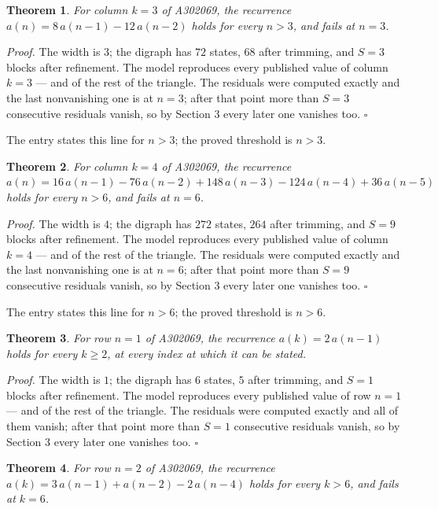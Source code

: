 \documentclass[11pt]{article}
\newtheorem{theorem}{Theorem}
\theoremstyle{definition}
\begin{document}
\begin{theorem} For column $k = 3$ of A302069, the recurrence $a(n) = 8\,a(n-1) - 12\,a(n-2)$ holds for every $n > 3$, and fails at $n = 3$.\end{theorem}

{\itshape Proof.} The width is $3$; the digraph has $72$ states, $68$ after trimming, and $S = 3$ blocks after refinement. The model reproduces every published value of column $k = 3$ --- and of the rest of the triangle. The residuals were computed exactly and the last nonvanishing one is at $n = 3$; after that point more than $S = 3$ consecutive residuals vanish, so by Section 3 every later one vanishes too. $\square$

The entry states this line for $n > 3$; the proved threshold is $n > 3$.

\begin{theorem} For column $k = 4$ of A302069, the recurrence $a(n) = 16\,a(n-1) - 76\,a(n-2) + 148\,a(n-3) - 124\,a(n-4) + 36\,a(n-5)$ holds for every $n > 6$, and fails at $n = 6$.\end{theorem}

{\itshape Proof.} The width is $4$; the digraph has $272$ states, $264$ after trimming, and $S = 9$ blocks after refinement. The model reproduces every published value of column $k = 4$ --- and of the rest of the triangle. The residuals were computed exactly and the last nonvanishing one is at $n = 6$; after that point more than $S = 9$ consecutive residuals vanish, so by Section 3 every later one vanishes too. $\square$

The entry states this line for $n > 6$; the proved threshold is $n > 6$.

\begin{theorem} For row $n = 1$ of A302069, the recurrence $a(k) = 2\,a(n-1)$ holds for every $k \ge 2$, at every index at which it can be stated.\end{theorem}

{\itshape Proof.} The width is $1$; the digraph has $6$ states, $5$ after trimming, and $S = 1$ blocks after refinement. The model reproduces every published value of row $n = 1$ --- and of the rest of the triangle. The residuals were computed exactly and all of them vanish; after that point more than $S = 1$ consecutive residuals vanish, so by Section 3 every later one vanishes too. $\square$

\begin{theorem} For row $n = 2$ of A302069, the recurrence $a(k) = 3\,a(n-1) + a(n-2) - 2\,a(n-4)$ holds for every $k > 6$, and fails at $k = 6$.\end{theorem}
\end{document}
